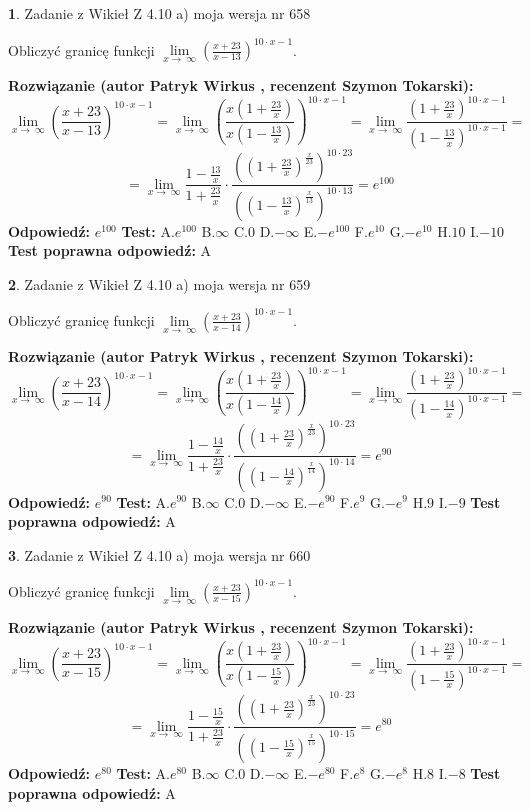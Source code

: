 \documentclass[12pt, a4paper]{article}
\theoremstyle{definition} %
\newtheorem{zad}{}
\newcommand{\zadStart}[1]{\begin{zad}#1\newline}
\newcommand{\zadStop}{\end{zad}}
\newcommand{\rozwStart}[2]{\noindent \textbf{Rozwiązanie (autor #1 , recenzent #2): }\newline}
\newcommand{\rozwStop}{\newline}
\newcommand{\odpStart}{\noindent \textbf{Odpowiedź:}\newline}
\newcommand{\odpStop}{\newline}
\newcommand{\testStart}{\noindent \textbf{Test:}\newline}
\newcommand{\testStop}{\newline}
\newcommand{\kluczStart}{\noindent \textbf{Test poprawna odpowiedź:}\newline}
\newcommand{\kluczStop}{\newline}
\begin{document}
\zadStart{Zadanie z Wikieł Z 4.10 a) moja wersja nr 658}

Obliczyć granicę funkcji  $\lim\limits_{x\to\ \infty}(\frac{x+23}{x-13})^{10\cdot x-1}$.
\zadStop
\rozwStart{Patryk Wirkus}{Szymon Tokarski}
$$\lim\limits_{x\to\ \infty}(\frac{x+23}{x-13})^{10\cdot x-1} = \lim\limits_{x\to\ \infty}(\frac{x(1+\frac{23}{x})}{x(1-\frac{13}{x})})^{10\cdot x-1}=\lim\limits_{x\to\ \infty}\frac{(1+\frac{23}{x})^{10\cdot x-1}}{(1-\frac{13}{x})^{10\cdot x-1}}=$$
$$=\lim\limits_{x\to\ \infty}\frac{1-\frac{13}{x}}{1+\frac{23}{x}}\cdot\frac{((1+\frac{23}{x})^{\frac{x}{23}})^{10\cdot23}}{((1-\frac{13}{x})^{\frac{x}{13}})^{10\cdot13}}=e^{100}$$
\rozwStop
\odpStart
$e^{100}$
\odpStop
\testStart
A.$e^{100}$ B.$\infty$ C.$0$ D.$-\infty$ E.$-e^{100}$
F.$e^{10}$ G.$-e^{10}$
H.$10$
I.$-10$
\testStop
\kluczStart
A
\kluczStop



\zadStart{Zadanie z Wikieł Z 4.10 a) moja wersja nr 659}

Obliczyć granicę funkcji  $\lim\limits_{x\to\ \infty}(\frac{x+23}{x-14})^{10\cdot x-1}$.
\zadStop
\rozwStart{Patryk Wirkus}{Szymon Tokarski}
$$\lim\limits_{x\to\ \infty}(\frac{x+23}{x-14})^{10\cdot x-1} = \lim\limits_{x\to\ \infty}(\frac{x(1+\frac{23}{x})}{x(1-\frac{14}{x})})^{10\cdot x-1}=\lim\limits_{x\to\ \infty}\frac{(1+\frac{23}{x})^{10\cdot x-1}}{(1-\frac{14}{x})^{10\cdot x-1}}=$$
$$=\lim\limits_{x\to\ \infty}\frac{1-\frac{14}{x}}{1+\frac{23}{x}}\cdot\frac{((1+\frac{23}{x})^{\frac{x}{23}})^{10\cdot23}}{((1-\frac{14}{x})^{\frac{x}{14}})^{10\cdot14}}=e^{90}$$
\rozwStop
\odpStart
$e^{90}$
\odpStop
\testStart
A.$e^{90}$ B.$\infty$ C.$0$ D.$-\infty$ E.$-e^{90}$
F.$e^{9}$ G.$-e^{9}$
H.$9$
I.$-9$
\testStop
\kluczStart
A
\kluczStop



\zadStart{Zadanie z Wikieł Z 4.10 a) moja wersja nr 660}

Obliczyć granicę funkcji  $\lim\limits_{x\to\ \infty}(\frac{x+23}{x-15})^{10\cdot x-1}$.
\zadStop
\rozwStart{Patryk Wirkus}{Szymon Tokarski}
$$\lim\limits_{x\to\ \infty}(\frac{x+23}{x-15})^{10\cdot x-1} = \lim\limits_{x\to\ \infty}(\frac{x(1+\frac{23}{x})}{x(1-\frac{15}{x})})^{10\cdot x-1}=\lim\limits_{x\to\ \infty}\frac{(1+\frac{23}{x})^{10\cdot x-1}}{(1-\frac{15}{x})^{10\cdot x-1}}=$$
$$=\lim\limits_{x\to\ \infty}\frac{1-\frac{15}{x}}{1+\frac{23}{x}}\cdot\frac{((1+\frac{23}{x})^{\frac{x}{23}})^{10\cdot23}}{((1-\frac{15}{x})^{\frac{x}{15}})^{10\cdot15}}=e^{80}$$
\rozwStop
\odpStart
$e^{80}$
\odpStop
\testStart
A.$e^{80}$ B.$\infty$ C.$0$ D.$-\infty$ E.$-e^{80}$
F.$e^{8}$ G.$-e^{8}$
H.$8$
I.$-8$
\testStop
\kluczStart
A
\kluczStop
\end{document}
